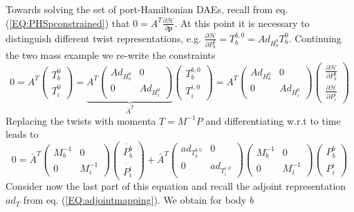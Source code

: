 \documentclass[a4paper,twoside, openright,12pt]{report}
\newcommand{\f}[1]{\boldsymbol{#1}}
\begin{document}
Towards solving the set of port-Hamiltonian DAEs, recall from eq. (\ref{EQ:PHSpconstrained}) that $0=A^T\frac{\partial \mathcal{H}}{\partial \f{p}}$. At this point it is necessary to distinguish different twist representations, e.g. $\frac{\partial \mathcal{H}}{\partial P_b^b} = T_b^{b,0} = Ad_{H_0^b}T_b^0 $. Continuing the two mass example we re-write the constraints
\begin{equation}
0 = A^T \begin{pmatrix}T_b^0 \\ T_i^0 \end{pmatrix}
 = \underbrace{A^T \begin{pmatrix}
Ad_{H_b^0} & 0 \\ 0 & Ad_{H_i^0}\end{pmatrix}}_{\bar{A}^T}
\begin{pmatrix}
T_b^{b,0} \\ T_i^{i,0}\end{pmatrix} = A^T \begin{pmatrix}
Ad_{H_b^0} & 0 \\ 0 & Ad_{H_i^0}\end{pmatrix}
\begin{pmatrix}
\frac{\partial \mathcal{H}}{\partial P_b^b} \\
\frac{\partial \mathcal{H}}{\partial P_i^i}
\end{pmatrix}
\end{equation}
Replacing the twists with momenta $T = M^{-1}P$ and differentiating w.r.t to time leads to
\begin{equation}
0 = \bar{A}^T\begin{pmatrix}M_b^{-1} & 0 \\ 0 & M_i^{-1}\end{pmatrix} \begin{pmatrix}\dot{P_b^b} \\ \dot{P_i^i}\end{pmatrix}
 +
\bar{A}^T \begin{pmatrix}ad_{T_b^{b,0}} & 0 \\
0 & ad_{T_i^{i,0}}\end{pmatrix}\begin{pmatrix}M_b^{-1} & 0 \\ 0 & M_i^{-1}\end{pmatrix} \begin{pmatrix}P_b^b \\ P_i^i\end{pmatrix}
\end{equation}
Consider now the last part of this equation and recall the adjoint representation $ad_T$ from eq. (\ref{EQ:adjointmapping}). We obtain for body $b$
\end{document}
